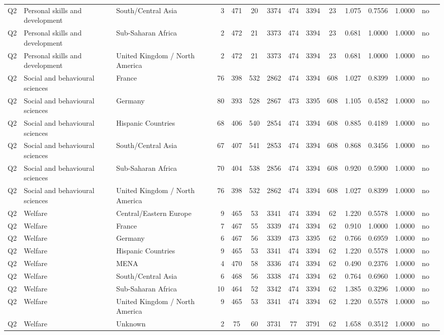 \begin{longtable}{lllrcccccccccll}
Q2 & Personal skills and development & South/Central Asia & 3 & 471 & 20 & 3374 & 474 & 3394 & 23 & 1.075 & 0.7556 & 1.0000 & no \\
Q2 & Personal skills and development & Sub-Saharan Africa & 2 & 472 & 21 & 3373 & 474 & 3394 & 23 & 0.681 & 1.0000 & 1.0000 & no \\
Q2 & Personal skills and development & United Kingdom / North America & 2 & 472 & 21 & 3373 & 474 & 3394 & 23 & 0.681 & 1.0000 & 1.0000 & no \\
Q2 & Social and behavioural sciences & France & 76 & 398 & 532 & 2862 & 474 & 3394 & 608 & 1.027 & 0.8399 & 1.0000 & no \\
Q2 & Social and behavioural sciences & Germany & 80 & 393 & 528 & 2867 & 473 & 3395 & 608 & 1.105 & 0.4582 & 1.0000 & no \\
Q2 & Social and behavioural sciences & Hispanic Countries & 68 & 406 & 540 & 2854 & 474 & 3394 & 608 & 0.885 & 0.4189 & 1.0000 & no \\
Q2 & Social and behavioural sciences & South/Central Asia & 67 & 407 & 541 & 2853 & 474 & 3394 & 608 & 0.868 & 0.3456 & 1.0000 & no \\
Q2 & Social and behavioural sciences & Sub-Saharan Africa & 70 & 404 & 538 & 2856 & 474 & 3394 & 608 & 0.920 & 0.5900 & 1.0000 & no \\
Q2 & Social and behavioural sciences & United Kingdom / North America & 76 & 398 & 532 & 2862 & 474 & 3394 & 608 & 1.027 & 0.8399 & 1.0000 & no \\
Q2 & Welfare & Central/Eastern Europe & 9 & 465 & 53 & 3341 & 474 & 3394 & 62 & 1.220 & 0.5578 & 1.0000 & no \\
Q2 & Welfare & France & 7 & 467 & 55 & 3339 & 474 & 3394 & 62 & 0.910 & 1.0000 & 1.0000 & no \\
Q2 & Welfare & Germany & 6 & 467 & 56 & 3339 & 473 & 3395 & 62 & 0.766 & 0.6959 & 1.0000 & no \\
Q2 & Welfare & Hispanic Countries & 9 & 465 & 53 & 3341 & 474 & 3394 & 62 & 1.220 & 0.5578 & 1.0000 & no \\
Q2 & Welfare & MENA & 4 & 470 & 58 & 3336 & 474 & 3394 & 62 & 0.490 & 0.2376 & 1.0000 & no \\
Q2 & Welfare & South/Central Asia & 6 & 468 & 56 & 3338 & 474 & 3394 & 62 & 0.764 & 0.6960 & 1.0000 & no \\
Q2 & Welfare & Sub-Saharan Africa & 10 & 464 & 52 & 3342 & 474 & 3394 & 62 & 1.385 & 0.3296 & 1.0000 & no \\
Q2 & Welfare & United Kingdom / North America & 9 & 465 & 53 & 3341 & 474 & 3394 & 62 & 1.220 & 0.5578 & 1.0000 & no \\
Q2 & Welfare & Unknown & 2 & 75 & 60 & 3731 & 77 & 3791 & 62 & 1.658 & 0.3512 & 1.0000 & no \\
\end{longtable}
